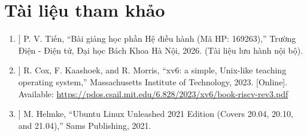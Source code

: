 \chapter*{Tài liệu tham khảo}

\begin{enumerate}
    
    \item[ [1] ] P. V. Tiến, ``Bài giảng học phần Hệ điều hành (Mã HP: 169263),'' Trường Điện - Điện tử, Đại học Bách Khoa Hà Nội, 2026. (Tài liệu lưu hành nội bộ).
    \item[ [2] ] R. Cox, F. Kaashoek, and R. Morris, ``xv6: a simple, Unix-like teaching operating system,'' Massachusetts Institute of Technology, 2023. [Online]. Available: \url{https://pdos.csail.mit.edu/6.828/2023/xv6/book-riscv-rev3.pdf}
    \item[ [3] ] M. Helmke, ``Ubuntu Linux Unleashed 2021 Edition (Covers 20.04, 20.10, and 21.04),'' Sams Publishing, 2021.
\end{enumerate}